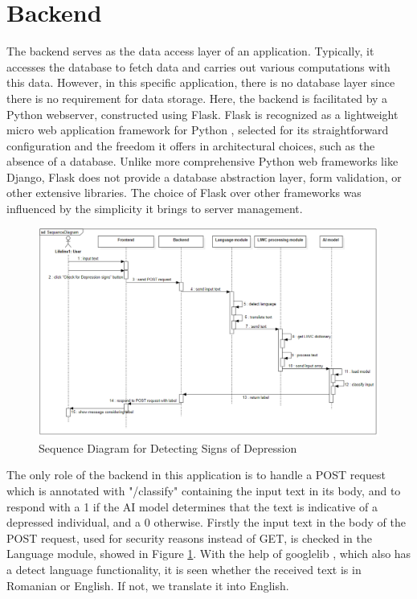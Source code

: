 \section{Backend}

\quad The backend serves as the data access layer of an application. Typically, it accesses the database to fetch data and carries out various computations with this data. However, in this specific application, there is no database layer since there is no requirement for data storage. Here, the backend is facilitated by a Python webserver, constructed using Flask. Flask is recognized as a lightweight micro web application framework for Python \cite{ronacher2021flask}, selected for its straightforward configuration and the freedom it offers in architectural choices, such as the absence of a database. Unlike more comprehensive Python web frameworks like Django, Flask does not provide a database abstraction layer, form validation, or other extensive libraries. The choice of Flask over other frameworks was influenced by the simplicity it brings to server management.

\begin{figure}[htbp]
	\centering
		\includegraphics[scale=0.5]{LaTeX Bachelor Thesis Depression Signs Detection/figures/SequnceDiagram.png}
	\caption{Sequence Diagram for Detecting Signs of Depression}
	\label{seqDiag}
\end{figure}

The only role of the backend in this application is to handle a POST request which is annotated with "/classify" containing the input text in its body, and to respond with a 1 if the AI model determines that the text is indicative of a depressed individual, and a 0 otherwise. Firstly the input text in the body of the POST request, used for security reasons instead of GET, is checked in the Language module, showed in Figure \ref{seqDiag}. With the help of googlelib \cite{googletranslib}, which also has a detect language functionality, it is seen whether the received text is in Romanian or English. If not, we translate it into English.

